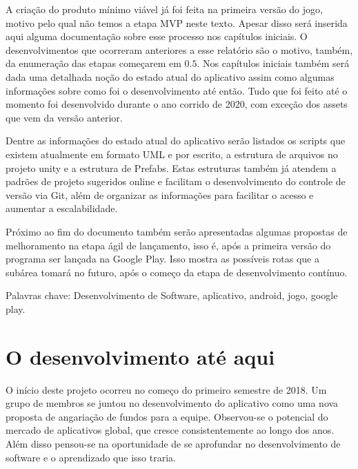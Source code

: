 {    A criação do produto mínimo viável já foi feita na primeira versão do jogo, motivo pelo qual não temos a etapa MVP neste texto. 
    Apesar disso será inserida aqui alguma documentação sobre esse processo nos capítulos iniciais.
    O desenvolvimentos que ocorreram anteriores a esse relatório são o motivo, também, da enumeração das etapas começarem em $0.5$.
    Nos capítulos iniciais também será dada uma detalhada noção do estado atual do aplicativo assim como algumas informações sobre como foi o desenvolvimento até então.
    Tudo que foi feito até o momento foi desenvolvido durante o ano corrido de 2020, com exceção dos assets que vem da versão anterior.

    Dentre as informações do estado atual do aplicativo serão listados os scripts que existem atualmente em formato UML e por escrito, a estrutura de arquivos no projeto unity e a estrutura de Prefabs.
    Estas estruturas também já atendem a padrões de projeto sugeridos online e facilitam o desenvolvimento do controle de versão via Git, além de organizar as informações para facilitar o acesso e aumentar a escalabilidade.

    Próximo ao fim do documento também serão apresentadas algumas propostas de melhoramento na etapa ágil de lançamento, isso é, após a primeira versão do programa ser lançada na Google Play. Isso mostra as possíveis rotas que a subárea tomará no futuro, após o começo da etapa de desenvolvimento contínuo.

	\vspace{1cm}
	{\large Palavras chave:} {\small Desenvolvimento de Software, aplicativo, android, jogo, google play.}

}

\tableofcontents          %
\thispagestyle{empty}     %
\listoffigures            %
\thispagestyle{empty}     %
\mainmatter

\chapter{O desenvolvimento até aqui}

    O início deste projeto ocorreu no começo do primeiro semestre de 2018. Um grupo de membros se juntou no desenvolvimento do aplicativo como uma nova proposta de angariação de fundos para a equipe. 
    Observou-se o potencial do mercado de aplicativos global, que cresce consistentemente ao longo dos anos.
    Além disso pensou-se na oportunidade de se aprofundar no desenvolvimento de software e o aprendizado que isso traria.

